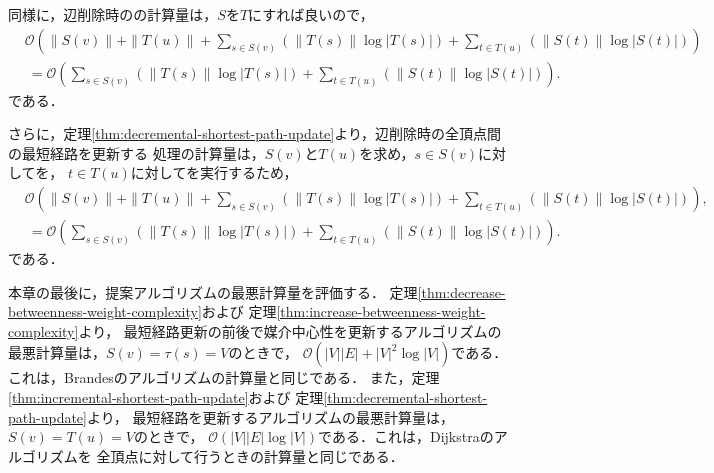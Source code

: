 同様に，辺削除時のの計算量は，$S$を$T$にすれば良いので，
\begin{equation*}
  \begin{aligned}
    &\mathcal{O}(\|S(v)\|+\|T(u)\|+\sum_{s\in S(v)}(\|T(s)\|\log|T(s)|)+\sum_{t\in T(u)}(\|S(t)\|\log|S(t)|))\\
    &\:=\mathcal{O}(\sum_{s\in S(v)}(\|T(s)\|\log|T(s)|)+\sum_{t\in T(u)}(\|S(t)\|\log|S(t)|)).
  \end{aligned}
\end{equation*}
である．

さらに，定理\ref{thm:decremental-shortest-path-update}より，辺削除時の全頂点間の最短経路を更新する
処理の計算量は，$S(v)$と$T(u)$を求め，$s\in S(v)$に対してを，
$t\in T(u)$に対してを実行するため，
\begin{align}
  &\mathcal{O}(\|S(v)\|+\|T(u)\|+\sum_{s\in S(v)}(\|T(s)\|\log|T(s)|)+\sum_{t\in T(u)}(\|S(t)\|\log|S(t)|)), \label{eq:full-decremental-shortest-path-update-weighted} \\
  &\:=\mathcal{O}(\sum_{s\in S(v)}(\|T(s)\|\log|T(s)|)+\sum_{t\in T(u)}(\|S(t)\|\log|S(t)|)). \label{eq:full-decremental-shortest-path-update-unweighted}
\end{align}
である．

本章の最後に，提案アルゴリズムの最悪計算量を評価する．
定理\ref{thm:decrease-betweenness-weight-complexity}および
定理\ref{thm:increase-betweenness-weight-complexity}より，
最短経路更新の前後で媒介中心性を更新するアルゴリズムの最悪計算量は，$S(v)=\tau(s)=V$のときで，
$\mathcal{O}(|V||E|+|V|^2\log|V|)$である．これは，Brandesのアルゴリズムの計算量と同じである．
また，定理\ref{thm:incremental-shortest-path-update}および
定理\ref{thm:decremental-shortest-path-update}より，
最短経路を更新するアルゴリズムの最悪計算量は，$S(v)=T(u)=V$のときで，
$\mathcal{O}(|V||E|\log|V|)$である．これは，Dijkstraのアルゴリズムを
全頂点に対して行うときの計算量と同じである．
